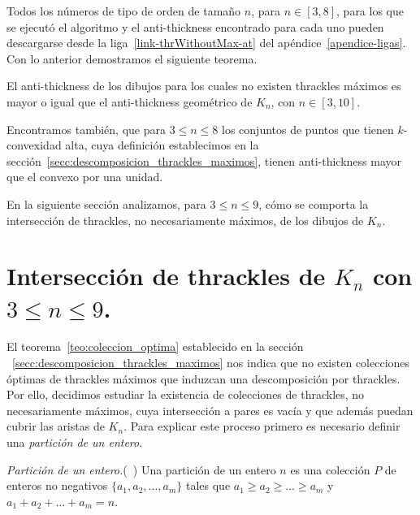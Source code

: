   Todos los números de tipo de orden de tamaño $n$, para $n \in [3,8]$, para los que se ejecutó el
  algoritmo y el anti-thickness encontrado para cada uno pueden descargarse desde la
  liga~\ref{link-thrWithoutMax-at} del apéndice~\ref{apendice-ligas}. Con lo anterior demostramos
  el siguiente teorema.
  \begin{theorem}
    \label{teo:at_sin_thracklesmax}
    El anti-thickness de los dibujos para los cuales no existen thrackles
    máximos es mayor o igual que el anti-thickness geométrico de $K_n$, con $n \in [3,10]$.
  \end{theorem}

  Encontramos también, que para $3 \leq n \leq 8$ los conjuntos de puntos que tienen $k$-convexidad
  alta, cuya definición establecimos en la sección~\ref{secc:descomposicion_thrackles_maximos},
  tienen anti-thickness mayor que el convexo por una unidad.

  En la siguiente sección analizamos, para $3 \leq n \leq 9$, cómo se comporta la intersección de
  thrackles, no necesariamente máximos, de los dibujos de $K_n$.

\section{Intersección de thrackles de $K_n$ con $3\leq n \leq 9$.}\label{secc:interseccion_thrackles}

    El teorema~\ref{teo:coleccion_optima} establecido en la sección
    ~\ref{secc:descomposicion_thrackles_maximos} nos indica que no existen colecciones óptimas de
    thrackles máximos que induzcan una descomposición por thrackles. Por ello, decidimos estudiar
    la existencia de colecciones de thrackles, no necesariamente máximos,
    cuya intersección a pares es vacía y que además puedan cubrir las aristas
    de $K_n$. Para explicar este proceso primero es necesario definir una
    \emph{partición de un entero}.

    \begin{definition}{\emph{Partición de un entero.}(~\cite{Knuth2011})}
      Una partición de un entero $n$ es una colección $P$ de enteros
      no negativos $\{a_1, a_2, \dots, a_m\}$ tales que
      $a_1 \geq a_2\geq \dots \geq a_m$ y $a_1 + a_2 + \dots + a_m = n$.
    \end{definition}

